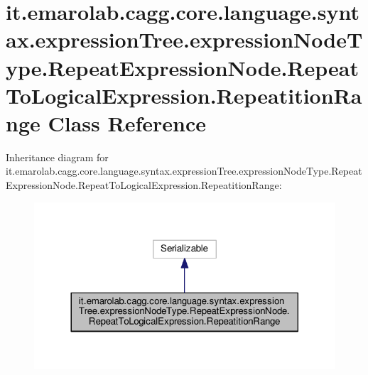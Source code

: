 \hypertarget{classit_1_1emarolab_1_1cagg_1_1core_1_1language_1_1syntax_1_1expressionTree_1_1expressionNodeTyp7498902e136f0103368e78415adbf7d0}{\section{it.\-emarolab.\-cagg.\-core.\-language.\-syntax.\-expression\-Tree.\-expression\-Node\-Type.\-Repeat\-Expression\-Node.\-Repeat\-To\-Logical\-Expression.\-Repeatition\-Range Class Reference}
\label{classit_1_1emarolab_1_1cagg_1_1core_1_1language_1_1syntax_1_1expressionTree_1_1expressionNodeTyp7498902e136f0103368e78415adbf7d0}
}


Inheritance diagram for it.\-emarolab.\-cagg.\-core.\-language.\-syntax.\-expression\-Tree.\-expression\-Node\-Type.\-Repeat\-Expression\-Node.\-Repeat\-To\-Logical\-Expression.\-Repeatition\-Range\-:\nopagebreak
\begin{figure}[H]
\begin{center}
\leavevmode
\includegraphics[width=320pt]{classit_1_1emarolab_1_1cagg_1_1core_1_1language_1_1syntax_1_1expressionTree_1_1expressionNodeTyp471a14458c88648628aefeeca27c5766}
\end{center}
\end{figure}


